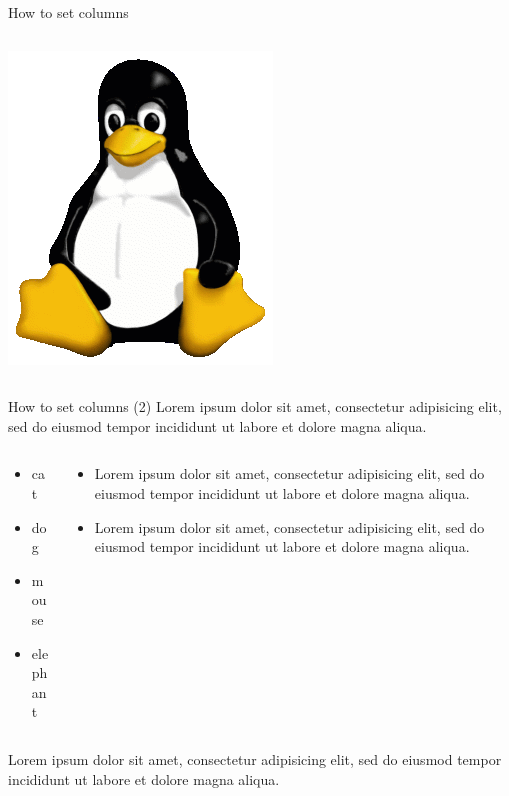 \documentclass[10pt, aspectratio=1610]{beamer}
\begin{document}
\begin{frame}{How to set columns}
\begin{columns}[T]
\begin{column}{.40\textwidth}
			\includegraphics[width=.9\textwidth]{pictures/Tux}
		\end{column}
	\end{columns}
\end{frame}


\begin{frame}{How to set columns (2)}
	Lorem ipsum dolor sit amet, consectetur adipisicing elit, sed do eiusmod tempor incididunt ut labore et dolore magna aliqua. 
	\begin{columns}[t]
		\begin{column}{.35\textwidth}
			\begin{itemize}
				\item cat
				\item dog
				\item mouse
				\item elephant
			\end{itemize}
		\end{column}
		\begin{column}{.55\textwidth}
			\begin{itemize}
				\item Lorem ipsum dolor sit amet, consectetur adipisicing elit, sed do eiusmod tempor incididunt ut labore et dolore magna aliqua. 
				\item Lorem ipsum dolor sit amet, consectetur adipisicing elit, sed do eiusmod tempor incididunt ut labore et dolore magna aliqua. 
			\end{itemize}
		\end{column}
	\end{columns}

	Lorem ipsum dolor sit amet, consectetur adipisicing elit, sed do eiusmod tempor incididunt ut labore et dolore magna aliqua. 
\end{frame}
\end{document}

